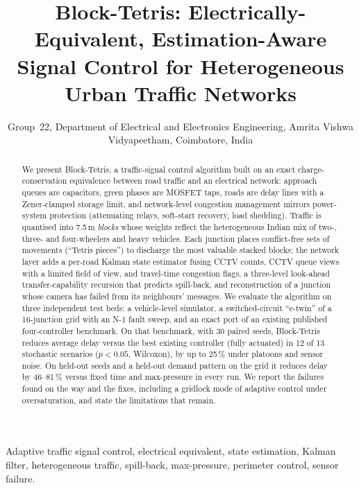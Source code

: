 \documentclass[journal]{IEEEtran}
\begin{document}
\title{Block-Tetris: Electrically-Equivalent, Estimation-Aware Signal Control for Heterogeneous Urban Traffic Networks}

\author{Group~22, Department of Electrical and Electronics Engineering, Amrita Vishwa Vidyapeetham, Coimbatore, India%
}

\maketitle

\begin{abstract}
We present Block-Tetris, a traffic-signal control algorithm built on an exact
charge-conservation equivalence between road traffic and an electrical network:
approach queues are capacitors, green phases are MOSFET taps, roads are delay lines
with a Zener-clamped storage limit, and network-level congestion management mirrors
power-system protection (attenuating relays, soft-start recovery, load shedding).
Traffic is quantised into 7.5\,m \emph{blocks} whose weights reflect the
heterogeneous Indian mix of two-, three- and four-wheelers and heavy vehicles.
Each junction places conflict-free sets of movements (``Tetris pieces'') to discharge
the most valuable stacked blocks; the network layer adds a per-road Kalman state
estimator fusing CCTV counts, CCTV queue views with a limited field of view, and
travel-time congestion flags, a three-level look-ahead transfer-capability
recursion that predicts spill-back, and reconstruction of a junction whose camera
has failed from its neighbours' messages.
We evaluate the algorithm on three independent test beds: a vehicle-level
simulator, a switched-circuit ``e-twin'' of a 16-junction grid with an N-1 fault
sweep, and an exact port of an existing published four-controller benchmark.
On that benchmark, with 30 paired seeds, Block-Tetris reduces average delay versus
the best existing controller (fully actuated) in 12 of 13 stochastic scenarios
($p<0.05$, Wilcoxon), by up to 25\,\% under platoons and sensor noise. On held-out
seeds and a held-out demand pattern on the grid it reduces delay by 46--81\,\%
versus fixed time and max-pressure in every run. We report the failures found
on the way and the fixes, including a gridlock mode of adaptive control under
oversaturation, and state the limitations that remain.
\end{abstract}

\begin{IEEEkeywords}
Adaptive traffic signal control, electrical equivalent, state estimation, Kalman filter,
heterogeneous traffic, spill-back, max-pressure, perimeter control, sensor failure.
\end{IEEEkeywords}
\end{document}
